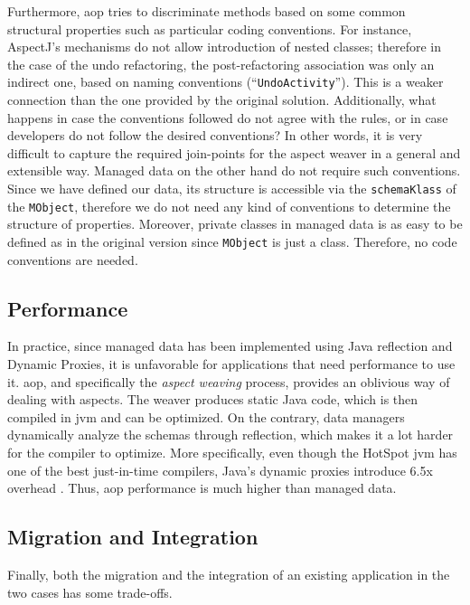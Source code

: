 Furthermore, \ac{aop} tries to discriminate methods based on some common structural properties such as particular coding conventions.
For instance, AspectJ's mechanisms do not allow introduction of nested classes; therefore in the case of the undo refactoring, the post-refactoring association was only an indirect one, based on naming conventions (``\texttt{UndoActivity}'').
This is a weaker connection than the one provided by the original solution.  
Additionally, what happens in case the conventions followed do not agree with the rules, or in case developers do not follow the desired conventions?
In other words, it is very difficult to capture the required join-points for the aspect weaver in a general and extensible way.
Managed data on the other hand do not require such conventions.
Since we have defined our data, its structure is accessible via the \texttt{schemaKlass} of the \texttt{MObject}, therefore we do not need any kind of conventions to determine the structure of properties.
Moreover, private classes in managed data is as easy to be defined as in the original version since \texttt{MObject} is just a class.
Therefore, no code conventions are needed.

\subsection{Performance}
In practice, since managed data has been implemented using Java reflection and Dynamic Proxies, it is unfavorable for applications that need performance to use it.
\ac{aop}, and specifically the \textit{aspect weaving} process, provides an oblivious way of dealing with aspects.
The weaver produces static Java code, which is then compiled in \ac{jvm} and can be optimized.
On the contrary, data managers dynamically analyze the schemas through reflection, which makes it a lot harder for the compiler to optimize. 
More specifically, even though the HotSpot \ac{jvm} has one of the best just-in-time compilers, Java's dynamic proxies introduce 6.5x overhead \cite{marr2015zero}.
Thus, \ac{aop} performance is much higher than managed data.

\subsection{Migration and Integration}
Finally, both the migration and the integration of an existing application in the two cases has some trade-offs.

